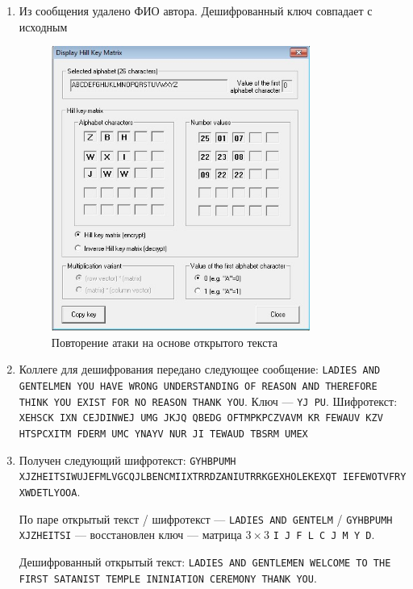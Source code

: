 \documentclass[a4paper, 14pt]{extarticle}
\begin{document}
\begin{enumerate}
    \item Из сообщения удалено ФИО автора. Дешифрованный ключ совпадает с исходным 
    \begin{figure}[h]
        \centering
        \includegraphics[width=0.8\textwidth]{./img/S005.jpg}
        \caption{Повторение атаки на основе открытого текста}%
        \label{img:1:4}
    \end{figure}
    
    \item Коллеге для дешифрования передано следующее сообщение: \texttt{LADIES AND GENTELMEN YOU HAVE WRONG UNDERSTANDING OF REASON AND THEREFORE THINK YOU EXIST FOR NO REASON THANK YOU}. Ключ --- \texttt{YJ PU}.
    Шифротекст: \texttt{XEHSCK IXN CEJDINWEJ UMG JKJQ QBEDG OFTMPKPCZVAVM KR FEWAUV KZV HTSPCXITM FDERM UMC YNAYV NUR JI TEWAUD TBSRM UMEX} 

    \item Получен следующий шифротекст: \texttt{GYHBPUMH XJZHEITSIWUJEFMLVGCQJLBENCMIIXTRRDZANIUTRRKGEXHOLEKEXQT IEFEWOTVFRY XWDETLYOOA}.

    По паре открытый текст / шифротекст --- \texttt{LADIES AND GENTELM} / \texttt{GYHBPUMH XJZHEITSI} --- восстановлен ключ --- матрица $3\times3$ \texttt{I J F L C J M Y D}. 

    Дешифрованный открытый текст: \texttt{LADIES AND GENTLEMEN WELCOME TO THE FIRST SATANIST TEMPLE ININIATION CEREMONY THANK YOU}. 

\end{enumerate}
\end{document}
